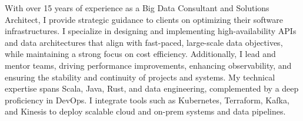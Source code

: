 

\begin{cvparagraph}

With over 15 years of experience as a Big Data Consultant and Solutions Architect, I provide strategic guidance to clients on optimizing their software infrastructures. I specialize in designing and implementing high-availability APIs and data architectures that align with fast-paced, large-scale data objectives, while maintaining a strong focus on cost efficiency. Additionally, I lead and mentor teams, driving performance improvements, enhancing observability, and ensuring the stability and continuity of projects and systems. My technical expertise spans Scala, Java, Rust, and data engineering, complemented by a deep proficiency in DevOps. I integrate tools such as Kubernetes, Terraform, Kafka, and Kinesis to deploy scalable cloud and on-prem systems and data pipelines.
\end{cvparagraph}
